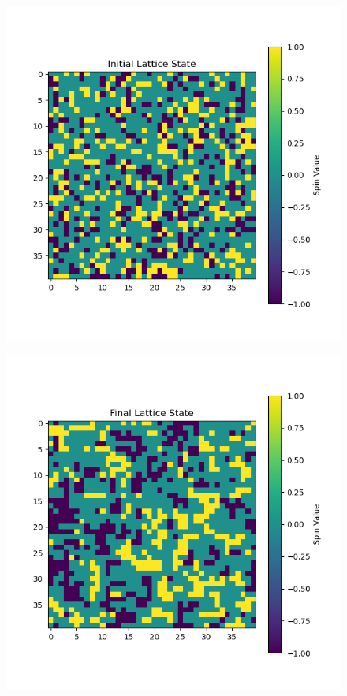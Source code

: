 \documentclass[12pt]{article}
\begin{document}
\begin{figure}
  \centering
  \includegraphics[max width=\textwidth]{lattice_state_0_0.4.png}
\end{figure}
\begin{figure}
  \centering
  \includegraphics[max width=\textwidth]{lattice_state_9999_0.4.png}
\end{figure}
\end{document}
